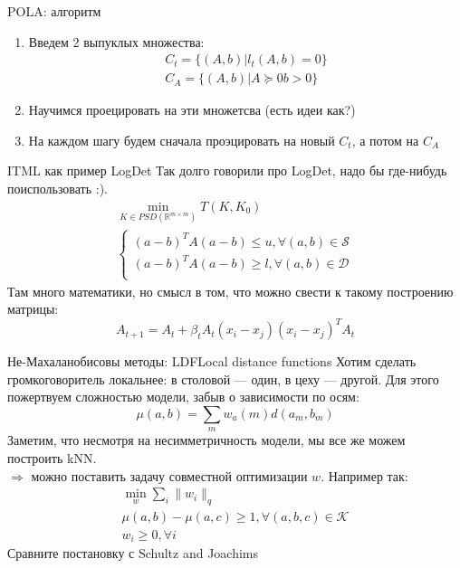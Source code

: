 \documentclass[14pt, fleqn, xcolor={dvipsnames, table}]{beamer}
\begin{document}
\begin{frame}{POLA: алгоритм}
\begin{enumerate}
  \item Введем 2 выпуклых множества:
  $$\begin{array}{c}
  C_t = \{(A,b) | l_t(A,b) = 0\} \\
  C_A = \{(A,b) | A \succeq 0 b > 0\}
  \end{array}$$
  \item Научимся проецировать на эти множетсва (есть идеи как?)
  \item На каждом шагу будем сначала проэцировать на новый $C_t$, а потом на $C_A$ 
\end{enumerate}
\end{frame}


\begin{frame}{ITML как пример LogDet}
Так долго говорили про LogDet, надо бы где-нибудь поиспользовать :).
$$\begin{array}{l}
\min_{K\in PSD(\mathbb{R}^{m\times m})} T(K,K_0) \\
\left\{\begin{array}{l}
(a - b)^T A (a - b) \le u, \forall (a,b) \in \mathcal{S} \\
(a - b)^T A (a - b) \ge l, \forall (a,b) \in \mathcal{D} \\
\end{array}\right.
\end{array}$$
Там много математики, но смысл в том, что можно свести к такому построению матрицы:
$$A_{t+1} = A_t + \beta_t A_t (x_i - x_j)(x_i - x_j)^TA_t$$
\end{frame}

\begin{frame}{Не-Махаланобисовы методы: LDF}{Local distance functions}
\small
Хотим сделать громкоговоритель локальнее: в столовой --- один, в цеху --- другой.
Для этого пожертвуем сложностью модели, забыв о зависимости по осям:
$$
\mu(a,b) = \sum_m w_a(m) d(a_{m}, b_{m})
$$
Заметим, что несмотря на несимметричность модели, мы все же можем построить kNN. \\
$\Rightarrow$ можно поставить задачу совместной оптимизации $w$. Например так:
$$\begin{array}{l}
\min_{w} \sum_i \|w_i\|_q \\
\mu(a, b) - \mu(a, c) \ge 1, \forall (a, b, c) \in \mathcal{K} \\
w_i\ge 0, \forall i
\end{array}$$
\footnotesize Сравните постановку с Schultz and Joachims
\end{frame}
\end{document}
